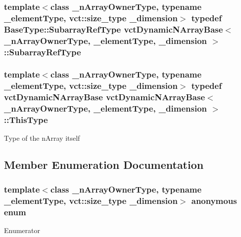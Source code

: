 \subsubsection[{Subarray\+Ref\+Type}]{\setlength{\rightskip}{0pt plus 5cm}template$<$class \+\_\+n\+Array\+Owner\+Type, typename \+\_\+element\+Type, vct\+::size\+\_\+type \+\_\+dimension$>$ typedef {\bf Base\+Type\+::\+Subarray\+Ref\+Type} {\bf vct\+Dynamic\+N\+Array\+Base}$<$ \+\_\+n\+Array\+Owner\+Type, \+\_\+element\+Type, \+\_\+dimension $>$\+::{\bf Subarray\+Ref\+Type}}\label{classvct_dynamic_n_array_base_a473d1fefa0debae5d9f6b0cd3a05f269}
\hypertarget{classvct_dynamic_n_array_base_a22ffd87e54134c364487952ce7d84dd5}{}
\subsubsection[{This\+Type}]{\setlength{\rightskip}{0pt plus 5cm}template$<$class \+\_\+n\+Array\+Owner\+Type, typename \+\_\+element\+Type, vct\+::size\+\_\+type \+\_\+dimension$>$ typedef {\bf vct\+Dynamic\+N\+Array\+Base} {\bf vct\+Dynamic\+N\+Array\+Base}$<$ \+\_\+n\+Array\+Owner\+Type, \+\_\+element\+Type, \+\_\+dimension $>$\+::{\bf This\+Type}}\label{classvct_dynamic_n_array_base_a22ffd87e54134c364487952ce7d84dd5}
Type of the n\+Array itself 

\subsection{Member Enumeration Documentation}
\hypertarget{classvct_dynamic_n_array_base_aa66532d28588bdf26d08fb593db815d6}{}\subsubsection[{anonymous enum}]{\setlength{\rightskip}{0pt plus 5cm}template$<$class \+\_\+n\+Array\+Owner\+Type, typename \+\_\+element\+Type, vct\+::size\+\_\+type \+\_\+dimension$>$ anonymous enum}\label{classvct_dynamic_n_array_base_aa66532d28588bdf26d08fb593db815d6}
\begin{Desc}
\item[Enumerator]\par
\begin{description}
\item[{\em 
\hypertarget{classvct_dynamic_n_array_base_aa66532d28588bdf26d08fb593db815d6abfcde386ec801b212d7c42d63a4f3837}{}D\+I\+M\+E\+N\+S\+I\+O\+N\label{classvct_dynamic_n_array_base_aa66532d28588bdf26d08fb593db815d6abfcde386ec801b212d7c42d63a4f3837}
}]\end{description}
\end{Desc}


